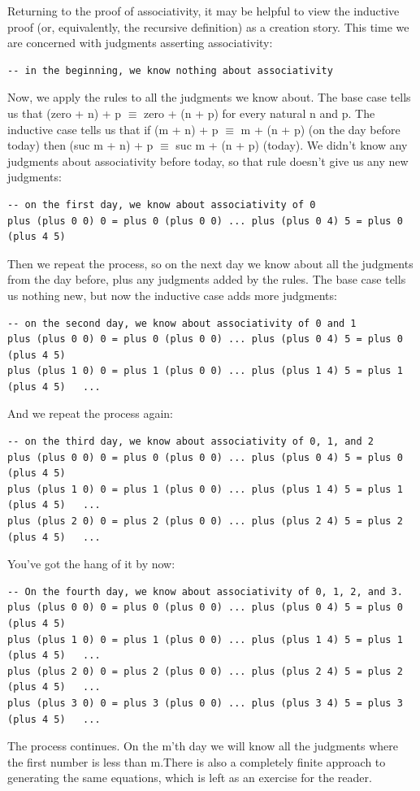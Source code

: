 \documentclass{memoir}
\newcommand{\PLFAEquiv}{\ensuremath{\equiv}}
\begin{document}
\par
Returning to the proof of associativity, it may be helpful to view the
inductive proof (or, equivalently, the recursive definition) as a creation
story. This time we are concerned with judgments asserting associativity:

\par
\par\noindent \begin{verbatim}
-- in the beginning, we know nothing about associativity
\end{verbatim}
Now, we apply the rules to all the judgments we know about. The base case tells us that (zero + n) + p \PLFAEquiv{} zero + (n + p) for every natural n and p. The inductive case tells us that if (m + n) + p \PLFAEquiv{} m + (n + p) (on the day before today) then (suc m + n) + p \PLFAEquiv{} suc m + (n + p) (today). We didn’t know any judgments about associativity before today, so that rule doesn’t give us any new judgments:\begin{verbatim}
-- on the first day, we know about associativity of 0
plus (plus 0 0) 0 = plus 0 (plus 0 0) ... plus (plus 0 4) 5 = plus 0 (plus 4 5)
\end{verbatim}
Then we repeat the process, so on the next day we know about all the judgments
from the day before, plus any judgments added by the rules. The base case tells
us nothing new, but now the inductive case adds more judgments:\begin{verbatim}
-- on the second day, we know about associativity of 0 and 1
plus (plus 0 0) 0 = plus 0 (plus 0 0) ... plus (plus 0 4) 5 = plus 0 (plus 4 5)
plus (plus 1 0) 0 = plus 1 (plus 0 0) ... plus (plus 1 4) 5 = plus 1 (plus 4 5)   ...
\end{verbatim}
And we repeat the process again:\begin{verbatim}
-- on the third day, we know about associativity of 0, 1, and 2
plus (plus 0 0) 0 = plus 0 (plus 0 0) ... plus (plus 0 4) 5 = plus 0 (plus 4 5)
plus (plus 1 0) 0 = plus 1 (plus 0 0) ... plus (plus 1 4) 5 = plus 1 (plus 4 5)   ...
plus (plus 2 0) 0 = plus 2 (plus 0 0) ... plus (plus 2 4) 5 = plus 2 (plus 4 5)   ...
\end{verbatim}
You've got the hang of it by now:\begin{verbatim}
-- On the fourth day, we know about associativity of 0, 1, 2, and 3.
plus (plus 0 0) 0 = plus 0 (plus 0 0) ... plus (plus 0 4) 5 = plus 0 (plus 4 5)
plus (plus 1 0) 0 = plus 1 (plus 0 0) ... plus (plus 1 4) 5 = plus 1 (plus 4 5)   ...
plus (plus 2 0) 0 = plus 2 (plus 0 0) ... plus (plus 2 4) 5 = plus 2 (plus 4 5)   ...
plus (plus 3 0) 0 = plus 3 (plus 0 0) ... plus (plus 3 4) 5 = plus 3 (plus 4 5)   ...
\end{verbatim}
The process continues. On the m'th day we will know all the judgments where the
first number is less than m.There is also a completely finite approach to generating the same equations,
which is left as an exercise for the reader.
\end{document}
